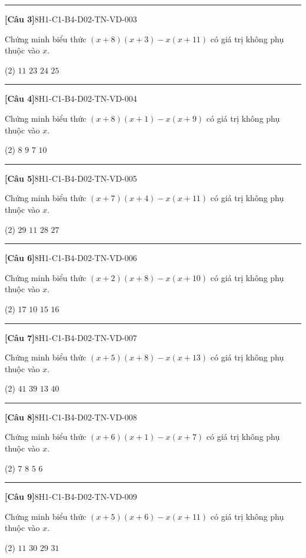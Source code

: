 \documentclass[12pt,a4paper]{article}
\newif\ifloigiai
\newenvironment{cauhoi}[2]{%
  \par\medskip\noindent\rule{\textwidth}{0.4pt}\par\nopagebreak
  \noindent\textbf{[#1]}\hfill{\scriptsize\ttfamily #2}\par\nopagebreak\smallskip}{\par}
\newcommand{\dapan}[1]{\ifloigiai\par\smallskip\noindent\textit{Đáp án:} \textbf{#1}\par\fi}
\begin{document}
\begin{cauhoi}{Câu 3}{8H1-C1-B4-D02-TN-VD-003}
Chứng minh biểu thức $(x+8)(x+3)-x(x+11)$ có giá trị không phụ thuộc vào $x$.
\begin{tasks}(2)
\task $11$
\task $23$
\task $24$
\task $25$
\end{tasks}
\dapan{C}
\end{cauhoi}
\begin{cauhoi}{Câu 4}{8H1-C1-B4-D02-TN-VD-004}
Chứng minh biểu thức $(x+8)(x+1)-x(x+9)$ có giá trị không phụ thuộc vào $x$.
\begin{tasks}(2)
\task $8$
\task $9$
\task $7$
\task $10$
\end{tasks}
\dapan{A}
\end{cauhoi}
\begin{cauhoi}{Câu 5}{8H1-C1-B4-D02-TN-VD-005}
Chứng minh biểu thức $(x+7)(x+4)-x(x+11)$ có giá trị không phụ thuộc vào $x$.
\begin{tasks}(2)
\task $29$
\task $11$
\task $28$
\task $27$
\end{tasks}
\dapan{C}
\end{cauhoi}
\begin{cauhoi}{Câu 6}{8H1-C1-B4-D02-TN-VD-006}
Chứng minh biểu thức $(x+2)(x+8)-x(x+10)$ có giá trị không phụ thuộc vào $x$.
\begin{tasks}(2)
\task $17$
\task $10$
\task $15$
\task $16$
\end{tasks}
\dapan{D}
\end{cauhoi}
\begin{cauhoi}{Câu 7}{8H1-C1-B4-D02-TN-VD-007}
Chứng minh biểu thức $(x+5)(x+8)-x(x+13)$ có giá trị không phụ thuộc vào $x$.
\begin{tasks}(2)
\task $41$
\task $39$
\task $13$
\task $40$
\end{tasks}
\dapan{D}
\end{cauhoi}
\begin{cauhoi}{Câu 8}{8H1-C1-B4-D02-TN-VD-008}
Chứng minh biểu thức $(x+6)(x+1)-x(x+7)$ có giá trị không phụ thuộc vào $x$.
\begin{tasks}(2)
\task $7$
\task $8$
\task $5$
\task $6$
\end{tasks}
\dapan{D}
\end{cauhoi}
\begin{cauhoi}{Câu 9}{8H1-C1-B4-D02-TN-VD-009}
Chứng minh biểu thức $(x+5)(x+6)-x(x+11)$ có giá trị không phụ thuộc vào $x$.
\begin{tasks}(2)
\task $11$
\task $30$
\task $29$
\task $31$
\end{tasks}
\dapan{B}
\end{cauhoi}
\end{document}
